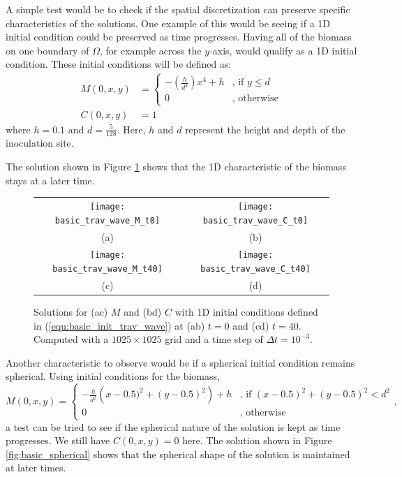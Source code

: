   A simple test would be to check if the spatial discretization can preserve specific characteristics of the solutions.
  One example of this would be seeing if a 1D initial condition could be preserved as time progresses.
  Having all of the biomass on one boundary of $\Omega$, for example across the $y$-axis, would qualify as a 1D initial condition.
  These initial conditions will be defined as:
  \begin{equation} \label{equ:basic_init_trav_wave}
    \begin{aligned}
    M(0,x,y) &= \begin{cases}
      -\left( \frac{h}{d^4} \right) x^4 + h & \text{, if } y \le d \\
      0 & \text{, otherwise}
    \end{cases} \\
    C(0,x,y) &= 1
    \end{aligned}
  \end{equation}
  where $h = 0.1$ and $d = \frac{5}{128}$.
  Here, $h$ and $d$ represent the height and depth of the inoculation site. 

  The solution shown in Figure \ref{fig:basic_trav} shows that the 1D characteristic of the biomass stays at a later time. 

  \begin{figure}
    \centering
    \begin{tabular}{c c}
      \texttt{[image: basic\_trav\_wave\_M\_t0]} & 
      \texttt{[image: basic\_trav\_wave\_C\_t0]} \\
      (a) & (b) \\
      \texttt{[image: basic\_trav\_wave\_M\_t40]} &
      \texttt{[image: basic\_trav\_wave\_C\_t40]}\\
      (c) & (d)
    \end{tabular}
    \caption{Solutions for (ac) $M$ and (bd) $C$ with 1D initial conditions defined in (\ref{equ:basic_init_trav_wave}) at (ab) $t = 0$ and (cd) $t = 40$. Computed with a $1025 \times 1025$ grid and a time step of $\Delta t = 10^{-3}$.}
    \label{fig:basic_trav}
  \end{figure}

  Another characteristic to observe would be if a spherical initial condition remains spherical.
  Using initial conditions for the biomass,
  \begin{equation} \label{equ:basic_spherical}
    M(0,x,y) = \begin{cases}
      - \frac{h}{d^2} \left( x - 0.5)^2 + (y - 0.5)^2 \right) + h  & \text{, if } (x - 0.5)^2 + (y - 0.5)^2 < d^2 \\
      0 & \text{, otherwise}
    \end{cases},
  \end{equation}
  a test can be tried to see if the spherical nature of the solution is kept as time progresses.
  We still have $C(0,x,y) = 0$ here.
  The solution shown in Figure \ref{fig:basic_spherical} shows that the spherical shape of the solution is maintained at later times.

